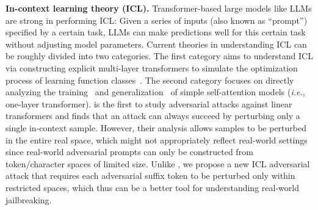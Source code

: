 \textbf{In-context learning theory (ICL).}
Transformer-based large models like LLMs are strong in performing ICL:
Given a series of inputs (also known as ``prompt'') specified by a certain task, LLMs can make predictions well for this certain task without adjusting model parameters.
Current theories in understanding ICL can be roughly divided into two categories.
The first category aims to understand ICL via constructing explicit multi-layer transformers to simulate the optimization process of learning function classes~\citep{garg2022can,von2023transformers,ahn2023transformers,chen2024transformers,mahankali2024one,wang2024incontext}.
The second category focuses on directly analyzing the training~\citep{zhang2024trained,yang2024incontext,huang2023context,wu2024how,lin2024transformers} and generalization~\citep{lu2024asymptotic,magen2024benign,frei2024trained,shi2024why} of simple self-attention models ({\it i.e.}, one-layer transformer).
\citet{anwar2024adversarial} is the first to study adversarial attacks against linear transformers and finds that an attack can always succeed by perturbing only a single in-context sample.
However, their analysis allows samples to be perturbed in the entire real space, which might not appropriately reflect real-world settings since real-world adversarial prompts can only be constructed from token/character spaces of limited size.
Unlike \citet{anwar2024adversarial}, we propose a new ICL adversarial attack that requires each adversarial suffix token to be perturbed only within restricted spaces, which thus can be a better tool for understanding real-world jailbreaking.